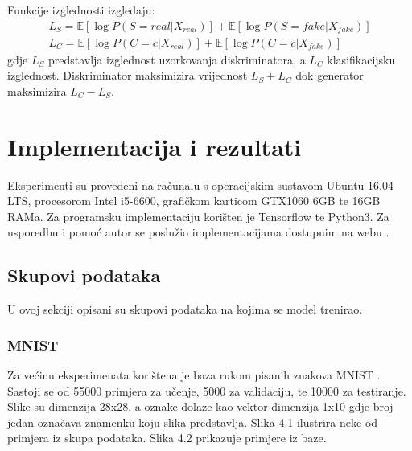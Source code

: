 \documentclass[times, utf8, diplomski]{fer}
\begin{document}
Funkcije izglednosti izgledaju:
\begin{gather}
L_S = \mathbb{E}[\log P(S = real | X_{real})] + \mathbb{E}[\log P(S = fake | X_{fake})] \\
\nonumber L_C = \mathbb{E}[\log P(C = c | X_{real})] + \mathbb{E}[\log P(C = c | X_{fake})]
\end{gather}
gdje $L_S$ predstavlja izglednost uzorkovanja diskriminatora, a $L_C$ klasifikacijsku izglednost. Diskriminator maksimizira vrijednost $L_S + L_C$ dok generator maksimizira $L_C - L_S$.

\chapter{Implementacija i rezultati}
Eksperimenti su provedeni na računalu s operacijskim sustavom Ubuntu 16.04 LTS, procesorom Intel i5-6600, grafičkom karticom GTX1060 6GB te 16GB RAMa. Za programsku implementaciju korišten je Tensorflow \cite{tensorflow} te Python3. Za usporedbu i pomoć autor se poslužio implementacijama dostupnim na webu \cite{wiseodd}\cite{carpedm}.

\section{Skupovi podataka}
U ovoj sekciji opisani su skupovi podataka na kojima se model trenirao. \par

\subsection{MNIST}
Za većinu eksperimenata korištena je baza rukom pisanih znakova MNIST \cite{mnist}. Sastoji se od 55000 primjera za učenje, 5000 za validaciju, te 10000 za testiranje. Slike su dimenzija 28x28, a oznake dolaze kao vektor dimenzija 1x10 gdje broj jedan označava znamenku koju slika predstavlja. Slika 4.1 ilustrira neke od primjera iz skupa podataka. Slika 4.2 prikazuje primjere iz baze.
\end{document}
